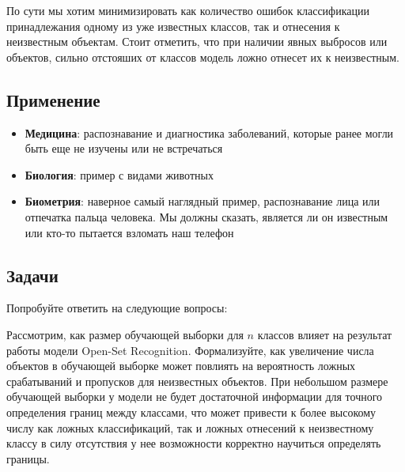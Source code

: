 По сути мы хотим минимизировать как количество ошибок классификации принадлежания одному из уже известных классов, так и отнесения к неизвестным объектам.
Стоит отметить, что при наличии явных выбросов или объектов, сильно отстояших от классов модель ложно отнесет их к неизвестным.

\subsection{Применение}
\begin{itemize}
    \item \textbf{Медицина}: распознавание и диагностика заболеваний, которые ранее могли быть еще не изучены или не встречаться
    \item \textbf{Биология}: пример с видами животных
    \item \textbf{Биометрия}: наверное самый наглядный пример, распознавание лица или отпечатка пальца человека. Мы должны сказать, является ли он известным или кто-то пытается взломать наш телефон
\end{itemize}

\subsection{Задачи}
Попробуйте ответить на следующие вопросы:

\problem Рассмотрим, как размер обучающей выборки для $n$ классов влияет на результат работы модели Open-Set Recognition.
Формализуйте, как увеличение числа объектов в обучающей выборке может повлиять на вероятность ложных срабатываний и пропусков для неизвестных объектов.
\solution При небольшом размере обучающей выборки у модели не будет достаточной информации для точного определения границ между классами, что может привести к более высокому числу как ложных классификаций, так и ложных отнесений к неизвестному классу в силу отсутствия у нее возможности корректно научиться определять границы.

